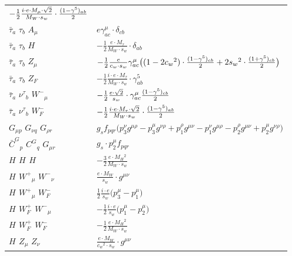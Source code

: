 \begin{center}
\begin{tabular}{|l|l|}
	$-\frac{1}{2}\frac{ i \cdot e \cdot M_{\mu} \cdot\sqrt{2}}{ M_W \cdot s_w}\cdot {(1-\gamma^5)_{a b}\over 2} $\\[2mm]
$\bar{\tau}{}_{a }$ \phantom{-} $\tau{}_{b }$ \phantom{-} ${A}_{\mu }$ \phantom{-}  &
	$ e\gamma_{a c}^\mu \cdot \delta_{c b} $\\[2mm]
$\bar{\tau}{}_{a }$ \phantom{-} $\tau{}_{b }$ \phantom{-} ${H}_{}$ \phantom{-}  &
	$-\frac{1}{2}\frac{ e \cdot M_{\tau}}{ M_W \cdot s_w}\cdot \delta_{a b} $\\[2mm]
$\bar{\tau}{}_{a }$ \phantom{-} $\tau{}_{b }$ \phantom{-} ${Z}_{\mu }$ \phantom{-}  &
	$-\frac{1}{2}\frac{ e}{ c_w \cdot s_w}\gamma_{a c}^\mu \big( (1-2 c_w {}^2)\cdot {(1-\gamma^5)_{c b}\over 2} +2 s_w{}^2 \cdot {(1+\gamma^5)_{c b}\over 2} \big)$\\[2mm]
$\bar{\tau}{}_{a }$ \phantom{-} $\tau{}_{b }$ \phantom{-} $Z_F{}_{}$ \phantom{-}  &
	$-\frac{1}{2}\frac{ i \cdot e \cdot M_{\tau}}{ M_W \cdot s_w}\cdot \gamma_{a b}^5 $\\[2mm]
$\bar{\tau}{}_{a }$ \phantom{-} $\nu^\tau{}_{b }$ \phantom{-} $W^-{}_{\mu }$ \phantom{-}  &
	$-\frac{1}{2}\frac{ e \cdot\sqrt{2}}{ s_w}\cdot \gamma_{a c}^\mu {(1-\gamma^5)_{c b}\over 2} $\\[2mm]
$\bar{\tau}{}_{a }$ \phantom{-} $\nu^\tau{}_{b }$ \phantom{-} $W^-_F{}_{}$ \phantom{-}  &
	$-\frac{1}{2}\frac{ i \cdot e \cdot M_{\tau} \cdot\sqrt{2}}{ M_W \cdot s_w}\cdot {(1-\gamma^5)_{a b}\over 2} $\\[2mm]
${G}_{\mu p }$ \phantom{-} ${G}_{\nu q }$ \phantom{-} ${G}_{\rho r }$ \phantom{-}  &
	$ g_sf_{p q r} \big(p_3^\nu g^{\mu \rho} -p_3^\mu g^{\nu \rho} +p_1^\rho g^{\mu \nu} -p_1^\nu g^{\mu \rho} -p_2^\rho g^{\mu \nu} +p_2^\mu g^{\nu \rho} \big)$\\[2mm]
$\bar{C}^G{}_{p }$ \phantom{-} $C^G{}_{q }$ \phantom{-} ${G}_{\mu r }$ \phantom{-}  &
	$ g_s\cdot p_2^\mu f_{p q r} $\\[2mm]
${H}_{}$ \phantom{-} ${H}_{}$ \phantom{-} ${H}_{}$ \phantom{-}  &
	$-\frac{3}{2}\frac{ e \cdot M_H{}^2 }{ M_W \cdot s_w}$\\[2mm]
${H}_{}$ \phantom{-} $W^+{}_{\mu }$ \phantom{-} $W^-{}_{\nu }$ \phantom{-}  &
	$\frac{ e \cdot M_W}{ s_w}\cdot g^{\mu \nu} $\\[2mm]
${H}_{}$ \phantom{-} $W^+{}_{\mu }$ \phantom{-} $W^-_F{}_{}$ \phantom{-}  &
	$\frac{1}{2}\frac{ i \cdot e}{ s_w}\big(p_3^\mu -p_1^\mu \big)$\\[2mm]
${H}_{}$ \phantom{-} $W^+_F{}_{}$ \phantom{-} $W^-{}_{\mu }$ \phantom{-}  &
	$-\frac{1}{2}\frac{ i \cdot e}{ s_w}\big(p_1^\mu -p_2^\mu \big)$\\[2mm]
${H}_{}$ \phantom{-} $W^+_F{}_{}$ \phantom{-} $W^-_F{}_{}$ \phantom{-}  &
	$-\frac{1}{2}\frac{ e \cdot M_H{}^2 }{ M_W \cdot s_w}$\\[2mm]
${H}_{}$ \phantom{-} ${Z}_{\mu }$ \phantom{-} ${Z}_{\nu }$ \phantom{-}  &
	$\frac{ e \cdot M_W}{ c_w{}^2  \cdot s_w}\cdot g^{\mu \nu} $\\ \hline
\end{tabular}


\end{center}
